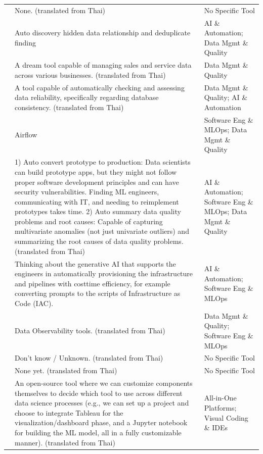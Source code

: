 \documentclass[11pt]{article}
\begin{document}
\begin{longtable}{l p{8.5cm} p{4.5cm}}
\addlinespace
17 & None. (translated from Thai) & No Specific Tool \\
\addlinespace
18 & Auto discovery hidden data relationship and deduplicate finding & AI \& Automation; Data Mgmt \& Quality \\
\addlinespace
19 & A dream tool capable of managing sales and service data across various businesses. (translated from Thai) & Data Mgmt \& Quality \\
\addlinespace
20 & A tool capable of automatically checking and assessing data reliability, specifically regarding database consistency. (translated from Thai) & Data Mgmt \& Quality; AI \& Automation \\
\addlinespace
21 & Airflow & Software Eng \& MLOps; Data Mgmt \& Quality \\
\addlinespace
22 & 1) Auto convert prototype to production: Data scientists can build prototype apps, but they might not follow proper software development principles and can have security vulnerabilities. Finding ML engineers, communicating with IT, and needing to reimplement prototypes takes time. 2) Auto summary data quality problems and root causes: Capable of capturing multivariate anomalies (not just univariate outliers) and summarizing the root causes of data quality problems. (translated from Thai) & AI \& Automation; Software Eng \& MLOps; Data Mgmt \& Quality \\
\addlinespace
23 & Thinking about the generative AI that supports the engineers in automatically provisioning the infrastructure and pipelines with cost\textbar{}time efficiency, for example converting prompts to the scripts of Infrastructure as Code (IAC). & AI \& Automation; Software Eng \& MLOps \\
\addlinespace
24 & Data Observability tools. (translated from Thai) & Data Mgmt \& Quality; Software Eng \& MLOps \\
\addlinespace
25 & Don't know / Unknown. (translated from Thai) & No Specific Tool \\
\addlinespace
26 & None yet. (translated from Thai) & No Specific Tool \\
\addlinespace
27 & An open-source tool where we can customize components themselves to decide which tool to use across different data science processes (e.g., we can set up a project and choose to integrate Tableau for the visualization/dashboard phase, and a Jupyter notebook for building the ML model, all in a fully customizable manner). (translated from Thai) & All-in-One Platforms; Visual Coding \& IDEs \\

\end{longtable}
\end{document}
